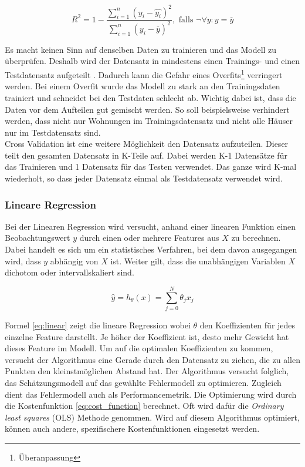 \begin{equation}\label{eq:r2}
R^2 = 1 - \frac{\sum_{i=1}^{n} (y_i - \hat{y_i})^2}{\sum_{i=1}^{n}(y_i - \overline{y})^2},\text{ falls } \neg \forall y:y = \overline{y}
\end{equation}

Es macht keinen Sinn auf denselben Daten zu trainieren und das Modell zu überprüfen. Deshalb wird der Datensatz in mindestens einen Trainings- und einen Testdatensatz aufgeteilt \cite{cross_validation}.
Dadurch kann die Gefahr eines Overfits\footnote{Überanpassung} verringert werden. Bei einem Overfit wurde das Modell zu stark an den Trainingsdaten trainiert und schneidet bei den Testdaten schlecht ab. Wichtig dabei ist, dass die Daten vor dem Aufteilen gut gemischt werden. So soll beispielsweise verhindert werden, dass nicht nur Wohnungen im Trainings\-datensatz und nicht alle Häuser nur im Testdatensatz sind.\\
Cross Validation ist eine weitere Möglichkeit den Datensatz aufzuteilen. Dieser teilt den gesamten Datensatz in K-Teile auf. Dabei werden K-1 Datensätze für das Trainieren und 1 Datensatz für das Testen verwendet. Das ganze wird K-mal wiederholt, so dass jeder Datensatz einmal als Testdatensatz verwendet wird.
%
\subsubsection{Lineare Regression}
Bei der Linearen Regression wird versucht, anhand einer linearen Funktion einen Beobachtungswert $y$ durch einen oder mehrere Features aus $X$ zu berechnen. Dabei handelt es sich um ein statistisches Verfahren, bei dem davon ausgegangen wird, dass $y$ abhängig von $X$ ist. Weiter gilt, dass die unabhängigen Variablen $X$ dichotom oder intervallskaliert sind.

\begin{equation}\label{eq:linear}
\hat{y} = h_\theta(x) = \sum_{j=0}^{N} \theta_j x_j
\end{equation}

Formel \eqref{eq:linear} zeigt die lineare Regression wobei $\theta$ den Koeffizienten für jedes einzelne Feature darstellt. Je höher der Koeffizient ist, desto mehr Gewicht hat dieses Feature im Modell. Um auf die optimalen Koeffizienten zu kommen, versucht der Algorithmus eine Gerade durch den Datensatz zu ziehen, die zu allen Punkten den kleinstmöglichen Abstand hat. Der Algorithmus versucht folglich, das Schätzungsmodell auf das gewählte Fehlermodell zu optimieren. Zugleich dient das Fehlermodell auch als Performancemetrik. Die Optimierung wird durch die Kostenfunktion \eqref{eq:cost_function} berechnet. Oft wird dafür die \textit{Ordinary least squares} (OLS) Methode genommen. Wird auf diesem Algorithmus optimiert, können auch andere, spezifischere Kostenfunktionen eingesetzt werden.

